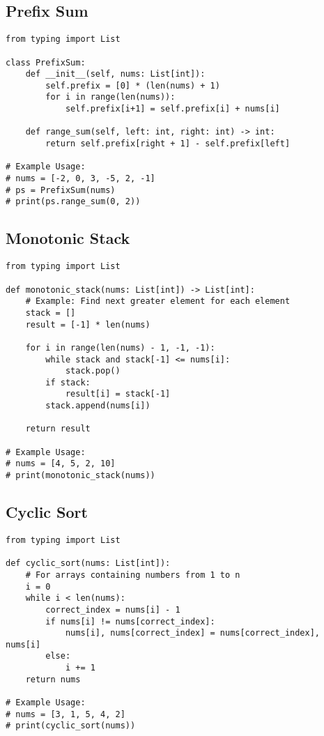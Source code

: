 \documentclass[11pt, a4paper]{article}
\begin{document}
\subsection{Prefix Sum}
\begin{verbatim}
from typing import List

class PrefixSum:
    def __init__(self, nums: List[int]):
        self.prefix = [0] * (len(nums) + 1)
        for i in range(len(nums)):
            self.prefix[i+1] = self.prefix[i] + nums[i]

    def range_sum(self, left: int, right: int) -> int:
        return self.prefix[right + 1] - self.prefix[left]

# Example Usage:
# nums = [-2, 0, 3, -5, 2, -1]
# ps = PrefixSum(nums)
# print(ps.range_sum(0, 2))
\end{verbatim}

\subsection{Monotonic Stack}
\begin{verbatim}
from typing import List

def monotonic_stack(nums: List[int]) -> List[int]:
    # Example: Find next greater element for each element
    stack = []
    result = [-1] * len(nums)
    
    for i in range(len(nums) - 1, -1, -1):
        while stack and stack[-1] <= nums[i]:
            stack.pop()
        if stack:
            result[i] = stack[-1]
        stack.append(nums[i])
        
    return result

# Example Usage:
# nums = [4, 5, 2, 10]
# print(monotonic_stack(nums))
\end{verbatim}

\subsection{Cyclic Sort}
\begin{verbatim}
from typing import List

def cyclic_sort(nums: List[int]):
    # For arrays containing numbers from 1 to n
    i = 0
    while i < len(nums):
        correct_index = nums[i] - 1
        if nums[i] != nums[correct_index]:
            nums[i], nums[correct_index] = nums[correct_index], nums[i]
        else:
            i += 1
    return nums

# Example Usage:
# nums = [3, 1, 5, 4, 2]
# print(cyclic_sort(nums))
\end{verbatim}
\end{document}
